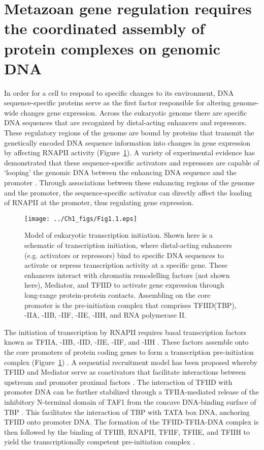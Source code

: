 \section{Metazoan gene regulation requires the coordinated assembly of protein complexes on genomic DNA}

In order for a cell to respond to specific changes to its environment, DNA sequence-specific proteins serve as the first factor responsible for altering genome-wide changes gene expression. Across the eukaryotic genome there are specific DNA sequences that are recognized by distal-acting enhancers and repressors. These regulatory regions of the genome are bound by proteins that transmit the genetically encoded DNA sequence information into changes in gene expression by affecting RNAPII activity (Figure~\ref{fig:Fig1.1}). A variety of experimental evidence has demonstrated that these sequence-specific activators and repressors are capable of ‘looping’ the genomic DNA between the enhancing DNA sequence and the promoter \cite{d_41}. Through associations between these enhancing regions of the genome and the promoter, the sequence-specific activator can directly affect the loading of RNAPII at the promoter, thus regulating gene expression.\\ 
\begin{figure}
\centering
\texttt{[image: ../Ch1\_figs/Fig1.1.eps]}
\caption[Model of eukaryotic transcription initiation]{Model of eukaryotic transcription initiation.  Shown here is a schematic of transcription initiation, where distal-acting enhancers (e.g. activators or repressors) bind to specific DNA sequences to activate or repress transcription activity at a specific gene.  These enhancers interact with chromatin remodelling factors (not shown here), Mediator, and TFIID to activate gene expression through long-range protein-protein contacts.  Assembling on the core promoter is the pre-initiation complex that comprises TFIID(TBP), -IIA, -IIB, -IIF, -IIE, -IIH, and RNA polymerase II.}
\label{fig:Fig1.1}
\end{figure}
\indent The initiation of transcription by RNAPII requires basal transcription factors known as TFIIA, -IIB, -IID, -IIE, -IIF, and -IIH \cite{Thomas_1201}. These factors assemble onto the core promoters of protein coding genes to form a transcription pre-initiation complex (Figure~\ref{fig:Fig1.1}) \cite{Buratowski_3748,Rhee_24}. A sequential recruitment model has been proposed whereby TFIID and Mediator serve as coactivators that facilitate interactions between upstream and promoter proximal factors \cite{Burley_3049}. The interaction of TFIID with promoter DNA can be further stabilized through a TFIIA-mediated release of the inhibitory N-terminal domain of TAF1 from the concave DNA-binding surface of TBP \cite{Bagby_2202,Geiger_2949,Liu_2574}. This facilitates the interaction of TBP with TATA box DNA, anchoring TFIID onto promoter DNA. The formation of the TFIID-TFIIA-DNA complex is then followed by the binding of TFIIB, RNAPII, TFIIF, TFIIE, and TFIIH to yield the transcriptionally competent pre-initiation complex \cite{Thomas_1201}.\\ 
